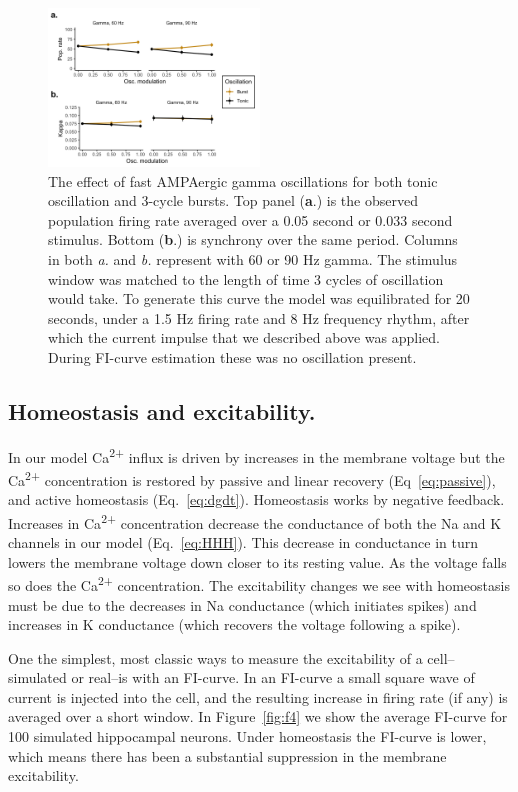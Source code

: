 \documentclass{article}
\begin{document}
\begin{figure}
\centering
\includegraphics[width=0.5\textwidth]{fig3.png}
\caption{\label{fig:f3}
    The effect of fast AMPAergic gamma oscillations for both tonic oscillation and 3-cycle bursts. 
    Top panel (\textbf{a}.) is the observed population firing rate averaged over a 0.05 second or 0.033 second stimulus. Bottom (\textbf{b}.) is synchrony over the same period. Columns in both \textit{a.} and \textit{b.} represent with 60 or 90 Hz gamma. The stimulus window was matched to the length of time 3 cycles of oscillation would take. To generate this curve the model was equilibrated for 20 seconds, under a 1.5 Hz firing rate and 8 Hz frequency rhythm, after which the current impulse that we described above was applied. During FI-curve estimation these was no oscillation present.
}
\end{figure}

\subsection*{Homeostasis and excitability.}
In our model Ca\textsuperscript{2+} influx is driven by increases in the membrane voltage but the Ca\textsuperscript{2+} concentration is restored by passive and linear recovery (Eq~\ref{eq:passive}), and active homeostasis (Eq.~\ref{eq:dgdt}). Homeostasis works by negative feedback. Increases in Ca\textsuperscript{2+} concentration decrease the conductance of both the Na and K channels in our model (Eq.~\ref{eq:HHH}). This decrease in conductance in turn lowers the membrane voltage down closer to its resting value. As the voltage falls so does the Ca\textsuperscript{2+} concentration. The excitability changes we see with homeostasis must be due to the decreases in Na conductance (which initiates spikes) and increases in K conductance (which recovers the voltage following a spike).

One the simplest, most classic ways to measure the excitability of a cell--simulated or real--is with an FI-curve. In an FI-curve a small square wave of current is injected into the cell, and the resulting increase in firing rate (if any) is averaged over a short window. In Figure~\ref{fig:f4} we show the average FI-curve for 100 simulated hippocampal neurons. Under homeostasis the FI-curve is lower, which means there has been a substantial suppression in the membrane excitability.
\end{document}
